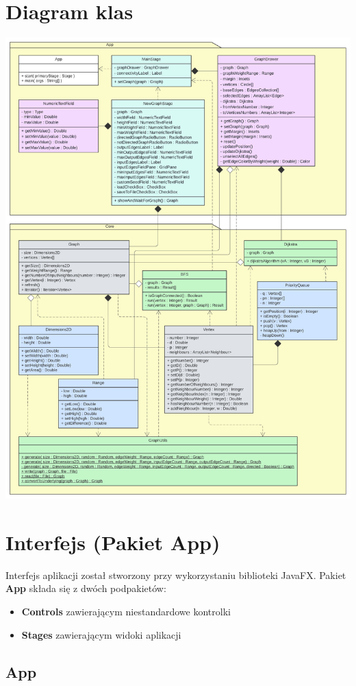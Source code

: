 \documentclass[11pt,a4paper]{report}
\begin{document}
    \section{Diagram klas}
    \begin{center}
        \includegraphics[width=\textwidth]{uml.png}
    \end{center}

    \newpage
    \section{Interfejs (Pakiet App)}

    Interfejs aplikacji został stworzony przy wykorzystaniu biblioteki JavaFX. Pakiet \textbf{App} składa się z dwóch podpakietów:

    \begin{itemize}
        \item \textbf{Controls} zawierającym niestandardowe kontrolki
        \item \textbf{Stages} zawierającym widoki aplikacji
    \end{itemize}

    \newpage
    \subsection{App}
\end{document}
